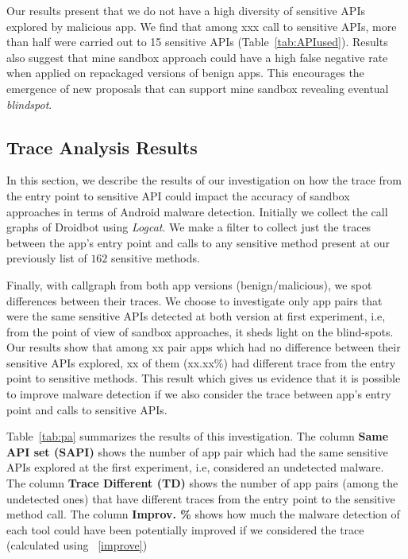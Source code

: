 \begin{obs}{1}{}
   Our results present that we do not have a high diversity of sensitive APIs explored by malicious app. We find that among xxx call to sensitive APIs, more than half were carried out to 15 sensitive APIs (Table~\ref{tab:APIused}). Results also suggest that mine sandbox approach could have a high false negative rate when applied on repackaged versions of benign apps. This encourages the emergence of new proposals that can support mine sandbox revealing eventual \textit{blindspot}.
 \end{obs}



\subsection{Trace Analysis Results}\label{sec:traceResults}

In this section, we describe the results of our investigation on how the trace from the entry point to sensitive API could impact the accuracy of sandbox approaches in terms of Android malware detection. Initially we collect the call graphs of Droidbot using \emph{Logcat}. We make a filter to collect just the traces between the app's entry point and calls to any sensitive method present at our previously list of $162$ sensitive methods.

Finally, with callgraph from both app versions (benign/malicious), we spot differences between their traces. We choose to investigate only app pairs that were the same sensitive APIs detected at both version at first experiment, i.e, from the point of view of sandbox approaches, it sheds light on the blind-spots. Our results show that among xx pair apps which had no difference between their sensitive APIs explored, xx of them (xx.xx\%) had different trace from the entry point to sensitive methods. This result which gives us evidence that it is possible to improve malware detection if we also consider the trace between app's entry point and calls to sensitive APIs.

Table~\ref{tab:pa} summarizes the results of this investigation. The column \textbf{Same API set (SAPI)} shows the number of app pair which had the same sensitive APIs explored at the first experiment, i.e, considered an undetected malware. The column  \textbf{Trace Different (TD)} shows the number of app pairs (among the undetected ones) that have different traces from the entry point to the sensitive method call. The column \textbf{Improv. \%} shows how much the malware detection of each tool could have been potentially improved if we considered the trace (calculated using ~\eqref{improve})

